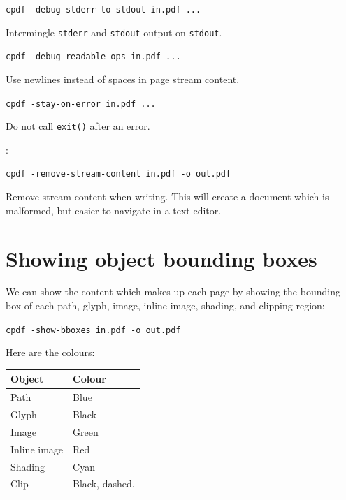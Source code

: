 \documentclass{book}
\begin{document}
  \begin{framed}
  \small\noindent\verb!cpdf -debug-stderr-to-stdout in.pdf ...!

  \vspace{2.5mm}
  \noindent Intermingle \texttt{stderr} and \texttt{stdout} output on \texttt{stdout}. 

  \end{framed}

  \begin{framed}
  \small\noindent\verb!cpdf -debug-readable-ops in.pdf ...!

  \vspace{2.5mm}
  \noindent Use newlines instead of spaces in page stream content. 

  \end{framed}

  \begin{framed}
  \small\noindent\verb!cpdf -stay-on-error in.pdf ...!

  \vspace{2.5mm}
  \noindent Do not call \texttt{exit()} after an error.

  \end{framed}

:

  \begin{framed}
  \small\noindent\verb!cpdf -remove-stream-content in.pdf -o out.pdf!

  \vspace{2.5mm}
  \noindent Remove stream content when writing. This will create a document which is malformed, but easier to navigate in a text editor. 

  \end{framed}

\section{Showing object bounding boxes}

We can show the content which makes up each page by showing the bounding box of each path, glyph, image, inline image, shading, and clipping region:

  \begin{framed}
  \small\noindent\verb!cpdf -show-bboxes in.pdf -o out.pdf!
  \end{framed}

\noindent Here are the colours:

\medskip
\begin{tabular}{ll}
\textbf{Object} & \textbf{Colour}\\\hline
Path & Blue \\
Glyph & Black\\
Image & Green\\
Inline image & Red\\
Shading & Cyan\\
Clip & Black, dashed.
\end{tabular}
\medskip
\end{document}
